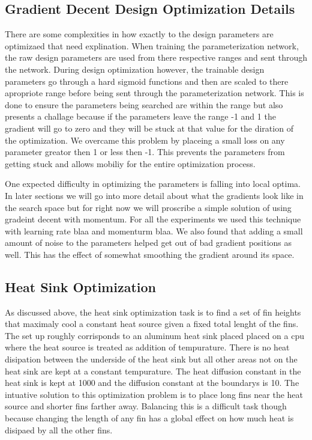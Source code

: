 \documentclass{article} %
\begin{document}
\subsection{Gradient Decent Design Optimization Details}

There are some complexities in how exactly to the design parameters are optimizaed that need explination. When training the parameterization network, the raw design parameters are used from there respective ranges and sent through the network. During design optimization however, the trainable design parameters go through a hard sigmoid functions and then are scaled to there apropriote range before being sent through the parameterization network. This is done to ensure the parameters being searched are within the range but also presents a challage because if the parameters leave the range -1 and 1 the gradient will go to zero and they will be stuck at that value for the diration of the optimization. We overcame this problem by placeing a small loss on any parameter greator then 1 or less then -1. This prevents the parameters from getting stuck and allows mobiliy for the entire optimization process.

One expected difficulty in optimizing the parameters is falling into local optima. In later sections we will go into more detail about what the gradients look like in the search space but for right now we will proscribe a simple solution of using gradeint decent with momentum. For all the experiments we used this technique with learning rate blaa and momenturm blaa. We also found that adding a small amount of noise to the parameters helped get out of bad gradient positions as well. This has the effect of somewhat smoothing the gradient around its space.

\subsection{Heat Sink Optimization}

As discussed above, the heat sink optimization task is to find a set of fin heights that maximaly cool a constant heat source given a fixed total lenght of the fins. The set up roughly corrisponds to an aluminum heat sink placed placed on a cpu where the heat source is treated as addition of tempurature. There is no heat disipation between the underside of the heat sink but all other areas not on the heat sink are kept at a constant tempurature. The heat diffusion constant in the heat sink is kept at 1000 and the diffusion constant at the boundarys is 10. The intuative solution to this optimization problem is to place long fins near the heat source and shorter fins farther away. Balancing this is a difficult task though because changing the length of any fin has a global effect on how much heat is disipaed by all the other fins. 
\end{document}
